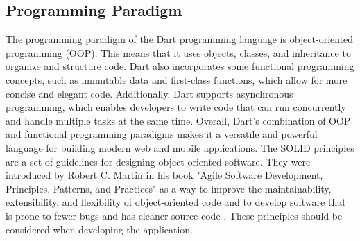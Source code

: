 \subsection{Programming Paradigm}
The programming paradigm of the Dart programming language is object-oriented programming (OOP). This means that it uses objects, classes, and inheritance to organize and structure code. Dart also incorporates some functional programming concepts, such as immutable data and first-class functions, which allow for more concise and elegant code. Additionally, Dart supports asynchronous programming, which enables developers to write code that can run concurrently and handle multiple tasks at the same time. Overall, Dart's combination of OOP and functional programming paradigms makes it a versatile and powerful language for building modern web and mobile applications. The SOLID principles are a set of guidelines for designing object-oriented software. They were introduced by Robert C. Martin in his book "Agile Software Development, Principles, Patterns, and Practices" as a way to improve the maintainability, extensibility, and flexibility of object-oriented code and to develop software that is prone to fewer bugs and has cleaner source code \cite{.martin}. These principles should be considered when developing the application.
